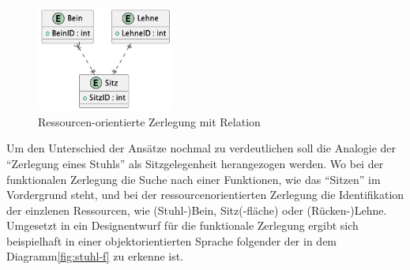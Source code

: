 \documentclass[../vs-script-first-v01.tex]{subfiles}
\begin{document}
\begin{figure}[ht!]
  \centering
  \includegraphics[width=0.4\textwidth]{fig/uml/stuhl-resourcen.png}
  \caption{Ressourcen-orientierte Zerlegung mit Relation}
  \label{fig:stuhl-r}
\end{figure}
Um den Unterschied der Ansätze nochmal zu verdeutlichen soll die Analogie der \enquote{Zerlegung eines Stuhls} als Sitzgelegenheit herangezogen werden. Wo bei der funktionalen Zerlegung die Suche nach einer Funktionen, wie das \enquote{Sitzen} im Vordergrund steht, und bei der ressourcenorientierten Zerlegung die Identifikation der einzlenen Ressourcen, wie (Stuhl-)Bein, Sitz(-fläche) oder (Rücken-)Lehne. Umgesetzt in ein Designentwurf für die funktionale Zerlegung ergibt sich beispielhaft in einer objektorientierten Sprache folgender der in dem Diagramm\ref{fig:stuhl-f} zu erkenne ist. 
\end{document}
